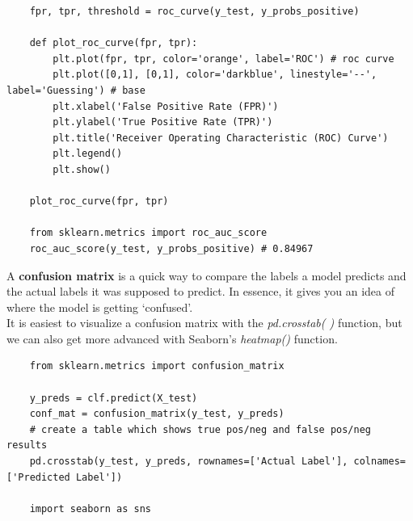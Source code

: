 \documentclass[11pt, a4paper]{article}
\begin{document}
\begin{spacing}{1.1}
	\begin{lstlisting}
	fpr, tpr, threshold = roc_curve(y_test, y_probs_positive)
	
	def plot_roc_curve(fpr, tpr):
		plt.plot(fpr, tpr, color='orange', label='ROC') # roc curve
		plt.plot([0,1], [0,1], color='darkblue', linestyle='--', label='Guessing') # base
		plt.xlabel('False Positive Rate (FPR)')
		plt.ylabel('True Positive Rate (TPR)')
		plt.title('Receiver Operating Characteristic (ROC) Curve')
		plt.legend()
		plt.show()
	
	plot_roc_curve(fpr, tpr) 
	
	from sklearn.metrics import roc_auc_score
	roc_auc_score(y_test, y_probs_positive) # 0.84967 \end{lstlisting} \vspace*{1mm}
	A \textbf{confusion matrix} is a quick way to compare the labels a model predicts and the actual labels it was supposed to predict. In essence, it gives you an idea of where the model is getting `confused'. \vspace*{1mm}\\ It is easiest to visualize a confusion matrix with the \textit{pd.crosstab( )} function, but we can also get more advanced with Seaborn's \textit{heatmap()} function.
	\begin{lstlisting}
	from sklearn.metrics import confusion_matrix
	
	y_preds = clf.predict(X_test)
	conf_mat = confusion_matrix(y_test, y_preds)
	# create a table which shows true pos/neg and false pos/neg results
	pd.crosstab(y_test, y_preds, rownames=['Actual Label'], colnames=['Predicted Label'])
	
	import seaborn as sns
	

\end{lstlisting}
\end{spacing}
\end{document}
